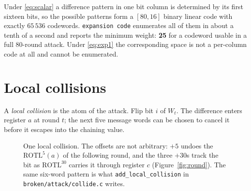 \documentclass[11pt,a4paper]{article}
\newcommand{\rotl}{\ensuremath{\mathrm{ROTL}}}
\begin{document}
Under \eqref{eq:scalar} a difference pattern in one bit column is determined
by its first sixteen bits, so the possible patterns form a $[80,16]$ binary
linear code with exactly $65\,536$ codewords. \texttt{expansion code}
enumerates all of them in about a tenth of a second and reports the minimum
weight: \textbf{25} for a codeword usable in a full 80-round attack. Under
\eqref{eq:exp1} the corresponding space is not a per-column code at all and
cannot be enumerated.

\section{Local collisions}\label{sec:local}

A \emph{local collision} is the atom of the attack. Flip bit $i$ of $W_t$. The
difference enters register $a$ at round $t$; the next five message words can
be chosen to cancel it before it escapes into the chaining value.

\begin{figure}[t]
\centering
{}
\caption{One local collision. The offsets are not arbitrary: $+5$ undoes the
$\rotl^{5}(a)$ of the following round, and the three $+30$s track the bit as
$\rotl^{30}$ carries it through register $c$ (Figure~\ref{fig:round}). The
same six-word pattern is what \texttt{add\_local\_collision} in
\texttt{broken/attack/collide.c} writes.}
\label{fig:local}
\end{figure}
\end{document}
